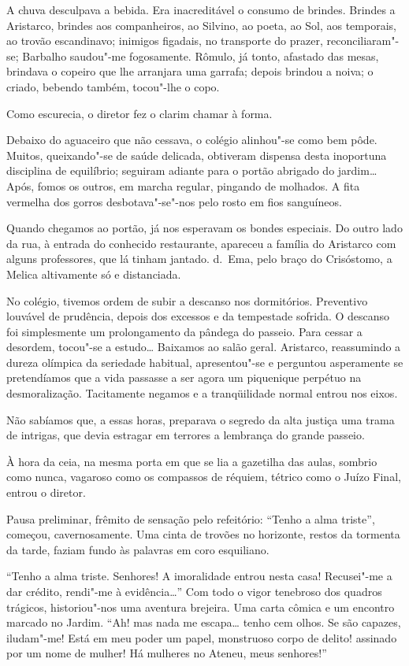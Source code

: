 A chuva desculpava a bebida.
Era inacreditável o consumo de brindes. Brindes a Aristarco, brindes
aos companheiros, ao Silvino, ao poeta, ao Sol, aos temporais, ao
trovão escandinavo; inimigos figadais, no transporte do prazer,
reconciliaram"-se; Barbalho saudou"-me fogosamente. Rômulo, já tonto,
afastado das mesas, brindava o copeiro que lhe arranjara uma garrafa;
depois brindou a noiva; o criado, bebendo também, tocou"-lhe o copo.

Como escurecia, o diretor fez o clarim chamar à forma. 

Debaixo do aguaceiro que não cessava, o colégio alinhou"-se como bem pôde.
Muitos, queixando"-se de saúde delicada, obtiveram dispensa desta
inoportuna disciplina de equilíbrio; seguiram adiante para o portão
abrigado do jardim\ldots{} Após, fomos os outros, em marcha regular,
pingando de molhados. A fita vermelha dos gorros desbotava"-se"-nos
pelo rosto em fios sanguíneos. 

Quando chegamos ao portão, já nos
esperavam os bondes especiais. Do outro lado da rua, à entrada do
conhecido restaurante, apareceu a família do Aristarco com alguns
professores, que lá tinham jantado. d.~Ema, pelo braço do Crisóstomo, a
Melica altivamente só e distanciada. 

No colégio, tivemos ordem de subir
a descanso nos dormitórios. Preventivo louvável de prudência, depois
dos excessos e da tempestade sofrida. O descanso foi simplesmente um
prolongamento da pândega do passeio. Para cessar a desordem, tocou"-se
a estudo\ldots{} Baixamos ao salão geral. Aristarco, reassumindo a dureza
olímpica da seriedade habitual, apresentou"-se e perguntou asperamente
se pretendíamos que a vida passasse a ser agora um piquenique perpétuo
na desmoralização. Tacitamente negamos e a tranqüilidade normal entrou
nos eixos. 

Não sabíamos que, a essas horas, preparava o segredo da alta
justiça uma trama de intrigas, que devia estragar em terrores a
lembrança do grande passeio. 

À hora da ceia, na mesma porta em que se
lia a gazetilha das aulas, sombrio como nunca, vagaroso como os
compassos de réquiem, tétrico como o Juízo Final, entrou o diretor.

Pausa preliminar, frêmito de sensação pelo refeitório: ``Tenho a alma
triste'', começou, cavernosamente. Uma cinta de trovões no 
horizonte, restos da tormenta da
tarde, faziam fundo às palavras em coro esquiliano. 

``Tenho a alma triste. Senhores! A imoralidade entrou nesta casa! 
Recusei"-me a dar crédito, rendi"-me à evidência\ldots{}'' 
Com todo o vigor tenebroso dos
quadros trágicos, historiou"-nos uma aventura brejeira. Uma carta
cômica e um encontro marcado no Jardim. ``Ah! mas nada me escapa\ldots{}
tenho cem olhos. Se são capazes, iludam"-me! Está em meu poder um
papel, monstruoso corpo de delito! assinado por um nome de mulher! Há
mulheres no Ateneu, meus senhores!'' 

